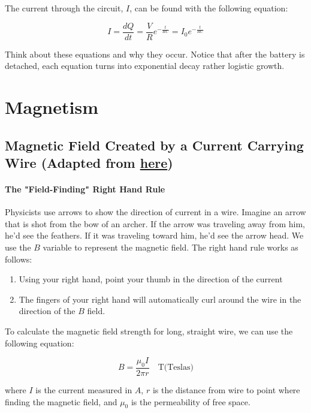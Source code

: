 \documentclass{scrartcl}
\theoremstyle{definition}
\begin{document}
	\begin{theorem}
		The current through the circuit, $I$, can be found with the following equation:
		
		$$
		I = \frac{dQ}{dt} = \frac{V}{R} e^{-\frac{t}{RC}} = I_0 e^{-\frac{t}{RC}}
		$$
	\end{theorem}
	
	\noindent Think about these equations and why they occur. Notice that after the battery is detached, each equation turns into exponential decay rather logistic growth.
	
	\newpage
	
	\section{Magnetism}
	
	\subsection{Magnetic Field Created by a Current Carrying Wire (Adapted from \href{https://physicsclassroom.com}{here})}
	
	\paragraph{The "Field-Finding" Right Hand Rule} Physicists use arrows to show the direction of current in a wire. Imagine an arrow that is shot from the bow of an archer. If the arrow was traveling away from him, he'd see the feathers. If it was traveling toward him, he'd see the arrow head. We use the $B$ variable to represent the magnetic field. The right hand rule works as follows:
	
	\begin{enumerate}
		\item Using your right hand, point your thumb in the direction of the current
		\item The fingers of your right hand will automatically curl around the wire in the direction of the $B$ field. 
	\end{enumerate}
	
	\begin{theorem}
		To calculate the magnetic field strength for long, straight wire, we can use the following equation:
		
		$$
		B = \frac{\mu_0 I}{2 \pi r} \quad \text{T(Teslas)}
		$$
		
		\noindent where $I$ is the current measured in $A$, $r$ is the distance from wire to point where finding the magnetic field, and $\mu_0$ is the permeability of free space.
	\end{theorem}
	
\end{document}
